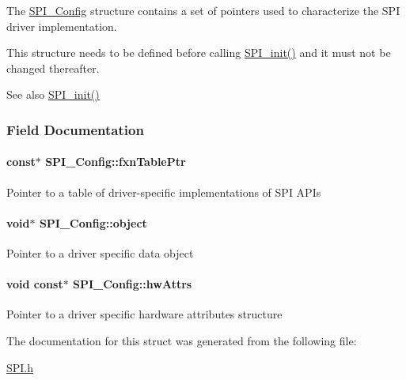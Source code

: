 The \hyperlink{struct_s_p_i___config}{S\+P\+I\+\_\+\+Config} structure contains a set of pointers used to characterize the S\+P\+I driver implementation.

This structure needs to be defined before calling \hyperlink{_s_p_i_8h_afd9b09f58917f0e2d14c61b956eba214}{S\+P\+I\+\_\+init()} and it must not be changed thereafter.

\begin{DoxySeeAlso}{See also}
\hyperlink{_s_p_i_8h_afd9b09f58917f0e2d14c61b956eba214}{S\+P\+I\+\_\+init()} 
\end{DoxySeeAlso}


\subsubsection{Field Documentation}
\paragraph[{fxn\+Table\+Ptr}]{ const$\ast$ S\+P\+I\+\_\+\+Config\+::fxn\+Table\+Ptr}\label{struct_s_p_i___config_a099238ad6e5c2ca2d38f041624362636}
Pointer to a table of driver-\/specific implementations of S\+P\+I A\+P\+Is 
\paragraph[{object}]{\setlength{\rightskip}{0pt plus 5cm}void$\ast$ S\+P\+I\+\_\+\+Config\+::object}\label{struct_s_p_i___config_a35884e199911642a791e9a422dfccba6}
Pointer to a driver specific data object 
\paragraph[{hw\+Attrs}]{\setlength{\rightskip}{0pt plus 5cm}void const$\ast$ S\+P\+I\+\_\+\+Config\+::hw\+Attrs}\label{struct_s_p_i___config_a4c8bfac4e9152b4e1da78f4926ecd4db}
Pointer to a driver specific hardware attributes structure 

The documentation for this struct was generated from the following file\+:\begin{DoxyCompactItemize}
\item 
\hyperlink{_s_p_i_8h}{S\+P\+I.\+h}\end{DoxyCompactItemize}
